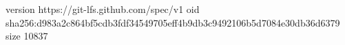 version https://git-lfs.github.com/spec/v1
oid sha256:d983a2c864bf5cdb3fdf34549705eff4b9db3c9492106b5d7084e30db36d6379
size 10837
